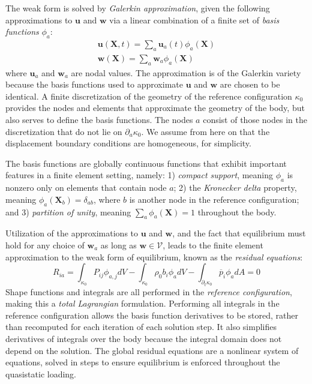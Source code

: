 The weak form is solved by \textit{Galerkin approximation}, given the following approximations to $\bm{u}$ and $\bm{w}$ via a linear combination of a finite set of \textit{basis functions} $\phi_a$:
\begin{gather}
\bm{u}(\bm{X},t) = \sum\limits_{a}\bm{u}_a(t)\phi_a(\bm{X}) \\
\bm{w}(\bm{X}) = \sum\limits_{a}\bm{w}_a\phi_a(\bm{X})
\end{gather}
where $\bm{u}_a$ and $\bm{w}_a$ are nodal values. The approximation is of the Galerkin variety because the basis functions used to approximate $\bm{u}$ and $\bm{w}$ are chosen to be identical. A finite discretization of the geometry of the reference configuration $\kappa_0$ provides the nodes and elements that approximate the geometry of the body, but also serves to define the basis functions. The nodes $a$ consist of those nodes in the discretization that do not lie on $\partial_a\kappa_0$. We assume from here on that the displacement boundary conditions are homogeneous, for simplicity.

The basis functions are globally continuous functions that exhibit important features in a finite element setting, namely: 1) \textit{compact support}, meaning $\phi_a$ is nonzero only on elements that contain node $a$; 2) the \textit{Kronecker delta} property, meaning $\phi_a(\bm{X}_b) = \delta_{ab}$, where $b$ is another node in the reference configuration; and 3) \textit{partition of unity}, meaning $\sum\limits_a\phi_a(\bm{X}) = 1$ throughout the body.

Utilization of the approximations to $\bm{u}$ and $\bm{w}$, and the fact that equilibrium must hold for any choice of $\bm{w}_a$ as long as $\bm{w} \in \mathcal{V}$, leads to the finite element approximation to the weak form of equilibrium, known as the \textit{residual equations}:
\begin{equation}
R_{ia} = \int_{\kappa_0}P_{ij}\phi_{a,j}dV - \int_{\kappa_0}\rho_0b_i\phi_adV - \int_{\partial_t\kappa_0} \overline{p}_i\phi_adA = 0
\label{eqn:elresid}
\end{equation}
Shape functions and integrals are all performed in the \textit{reference configuration}, making this a \textit{total Lagrangian} formulation. Performing all integrals in the reference configuration allows the basis function derivatives to be stored, rather than recomputed for each iteration of each solution step. It also simplifies derivatives of integrals over the body because the integral domain does not depend on the solution. The global residual equations are a nonlinear system of equations, solved in steps to ensure equilibrium is enforced throughout the quasistatic loading.

